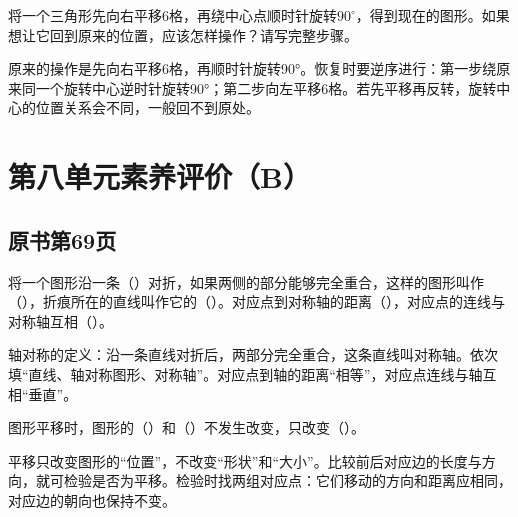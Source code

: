 将一个三角形先向右平移6格，再绕中心点顺时针旋转\(90^\circ\)，得到现在的图形。如果想让它回到原来的位置，应该怎样操作？请写完整步骤。\par
\begin{BookAnswer}
原来的操作是先向右平移6格，再顺时针旋转90°。恢复时要逆序进行：第一步绕原来同一个旋转中心逆时针旋转90°；第二步向左平移6格。若先平移再反转，旋转中心的位置关系会不同，一般回不到原处。
\end{BookAnswer}


\section{第八单元素养评价（B）}



\subsection*{原书第69页}

将一个图形沿一条（\hspace{1.8em}）对折，如果两侧的部分能够完全重合，这样的图形叫作（\hspace{1.8em}），折痕所在的直线叫作它的（\hspace{1.8em}）。对应点到对称轴的距离（\hspace{1.8em}），对应点的连线与对称轴互相（\hspace{1.8em}）。\par
\begin{BookAnswer}
轴对称的定义：沿一条直线对折后，两部分完全重合，这条直线叫对称轴。依次填“直线、轴对称图形、对称轴”。对应点到轴的距离“相等”，对应点连线与轴互相“垂直”。
\end{BookAnswer}

图形平移时，图形的（\hspace{1.8em}）和（\hspace{1.8em}）不发生改变，只改变（\hspace{1.8em}）。\par
\begin{BookAnswer}
平移只改变图形的“位置”，不改变“形状”和“大小”。比较前后对应边的长度与方向，就可检验是否为平移。检验时找两组对应点：它们移动的方向和距离应相同，对应边的朝向也保持不变。
\end{BookAnswer}

